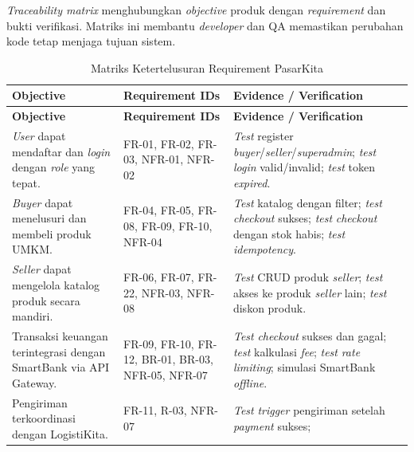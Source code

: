 
\textit{Traceability matrix} menghubungkan \textit{objective} produk dengan
\textit{requirement} dan bukti verifikasi. Matriks ini membantu \textit{developer}
dan QA memastikan perubahan kode tetap menjaga tujuan sistem.

\begin{longtable}{|L{4cm}|L{3.5cm}|L{7cm}|}
    \caption{Matriks Ketertelusuran Requirement PasarKita}
    \label{tab:traceability} \\
    \hline
    \textbf{Objective} & \textbf{Requirement IDs} & \textbf{Evidence / Verification} \\
    \hline
    \endfirsthead
    \hline
    \textbf{Objective} & \textbf{Requirement IDs} & \textbf{Evidence / Verification} \\
    \hline
    \endhead
    \hline
    \endfoot
    \textit{User} dapat mendaftar dan \textit{login} dengan \textit{role} yang
    tepat.
        & FR-01, FR-02, FR-03, NFR-01, NFR-02
        & \textit{Test} register \textit{buyer}/\textit{seller}/\textit{superadmin};
          \textit{test} \textit{login} valid/invalid; \textit{test} token
          \textit{expired}. \\
    \hline
    \textit{Buyer} dapat menelusuri dan membeli produk UMKM.
        & FR-04, FR-05, FR-08, FR-09, FR-10, NFR-04
        & \textit{Test} katalog dengan filter; \textit{test} \textit{checkout}
          sukses; \textit{test} \textit{checkout} dengan stok habis; \textit{test}
          \textit{idempotency}. \\
    \hline
    \textit{Seller} dapat mengelola katalog produk secara mandiri.
        & FR-06, FR-07, FR-22, NFR-03, NFR-08
        & \textit{Test} CRUD produk \textit{seller}; \textit{test} akses ke produk
          \textit{seller} lain; \textit{test} diskon produk. \\
    \hline
    Transaksi keuangan terintegrasi dengan SmartBank via API Gateway.
        & FR-09, FR-10, FR-12, BR-01, BR-03, NFR-05, NFR-07
        & \textit{Test} \textit{checkout} sukses dan gagal; \textit{test} kalkulasi
          \textit{fee}; \textit{test} \textit{rate limiting}; simulasi SmartBank
          \textit{offline}. \\
    \hline
    Pengiriman terkoordinasi dengan LogistiKita.
        & FR-11, R-03, NFR-07
        & \textit{Test} \textit{trigger} pengiriman setelah \textit{payment} sukses;

\end{longtable}
